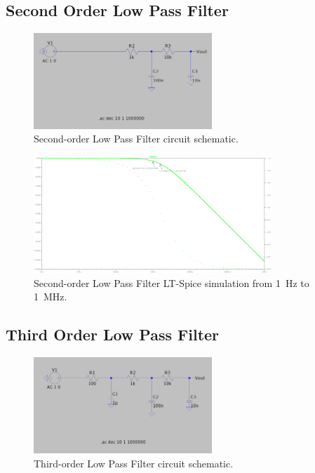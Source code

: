 \documentclass[CMPE]{../KGCOEReport}
\begin{document}
	\subsection*{Second Order Low Pass Filter}
	\begin{figure}[ht]
		\centering
		\includegraphics[width=0.6\textwidth]{second_order_schem}
		\caption{Second-order Low Pass Filter circuit schematic.}
		\label{fig:second_order_schem}
	\end{figure}

	\begin{figure}[ht]
		\centering
		\includegraphics[width=0.8\textwidth]{second_order}
		\caption{Second-order Low Pass Filter LT-Spice simulation from \SI{1}{\Hz} to \SI{1}{\mega\Hz}.}
		\label{fig:second_order}
	\end{figure}
	\pagebreak

	\subsection*{Third Order Low Pass Filter}
	\begin{figure}[ht]
		\centering
		\includegraphics[width=0.6\textwidth]{third_order_schem}
		\caption{Third-order Low Pass Filter circuit schematic.}
		\label{fig:second_order_schem}
	\end{figure}
\end{document}
